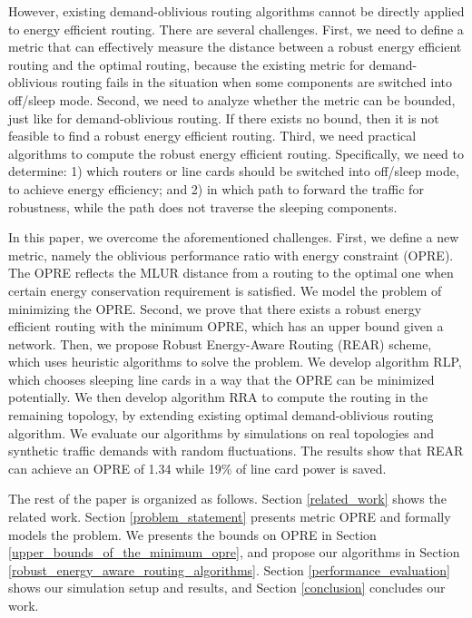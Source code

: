 \documentclass[conference]{IEEEtran}
\begin{document}
However, existing demand-oblivious routing algorithms cannot be directly applied to energy efficient routing. There are several challenges. First, we need to define a metric that can effectively measure the distance between a robust energy efficient routing and the optimal routing, because the existing metric for demand-oblivious routing fails in the situation when some components are switched into off/sleep mode. Second, we need to analyze whether the metric can be bounded, just like for demand-oblivious routing. If there exists no bound, then it is not feasible to find a robust energy efficient routing. Third, we need practical algorithms to compute the robust energy efficient routing. Specifically, we need to determine: 1) which routers or line cards should be switched into off/sleep mode, to achieve energy efficiency; and 2) in which path to forward the traffic for robustness, while the path does not traverse the sleeping components.

In this paper, we overcome the aforementioned challenges. First, we define a new metric, namely the oblivious performance ratio with energy constraint (OPRE). The OPRE reflects the MLUR distance from a routing to the optimal one when certain energy conservation requirement is satisfied. We model the problem of minimizing the OPRE. Second, we prove that there exists a robust energy efficient routing with the minimum OPRE, which has an upper bound given a network. Then, we propose Robust Energy-Aware Routing (REAR) scheme, which uses heuristic algorithms to solve the problem. We develop algorithm RLP, which chooses sleeping line cards in a way that the OPRE can be minimized potentially. We then develop algorithm RRA to compute the routing in the remaining topology, by extending existing optimal demand-oblivious routing algorithm. We evaluate our algorithms by simulations on real topologies and synthetic traffic demands with random fluctuations. The results show that REAR can achieve an OPRE of 1.34 while 19\% of line card power is saved.

The rest of the paper is organized as follows. Section \ref{related_work} shows the related work. Section \ref{problem_statement} presents metric OPRE and formally models the problem. We presents the bounds on OPRE in Section \ref{upper_bounds_of_the_minimum_opre}, and propose our algorithms in Section \ref{robust_energy_aware_routing_algorithms}. Section \ref{performance_evaluation} shows our simulation setup and results, and Section \ref{conclusion} concludes our work.
\end{document}
